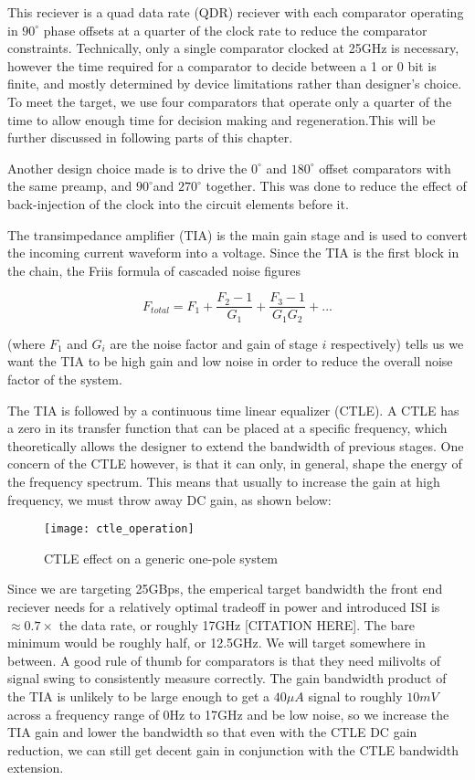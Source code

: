 This reciever is a quad data rate (QDR) reciever with each comparator operating in $90^\circ$ phase offsets at a quarter of the clock rate to reduce the comparator constraints. Technically, only a single comparator clocked at 25GHz is necessary, however the time required for a comparator to decide between a 1 or 0 bit is finite, and mostly determined by device limitations rather than designer's choice. To meet the target, we use four comparators that operate only a quarter of the time to allow enough time for decision making and regeneration.This will be further discussed in following parts of this chapter.

Another design choice made is to drive the $0^\circ$ and $180^\circ$ offset comparators with the same preamp, and $90^\circ$and $270^\circ$ together. This was done to reduce the effect of back-injection of the clock into the circuit elements before it.

The transimpedance amplifier (TIA) is the main gain stage and is used to convert the incoming current waveform into a voltage. Since the TIA is the first block in the chain, the Friis formula of cascaded noise figures

\begin{equation}
\label{friis}
F_{total}=F_1+\frac{F_2-1}{G_1}+\frac{F_3-1}{G_1G_2}+...
\end{equation}

(where $F_1$ and $G_i$ are the noise factor and gain of stage $i$ respectively) tells us we want the TIA to be high gain and low noise in order to reduce the overall noise factor of the system.

The TIA is followed by a continuous time linear equalizer (CTLE). A CTLE has a zero in its transfer function that can be placed at a specific frequency, which theoretically allows the designer to extend the bandwidth of previous stages. One concern of the CTLE however, is that it can only, in general, shape the energy of the frequency spectrum. This means that usually to increase the gain at high frequency, we must throw away DC gain, as shown below:

\begin{figure}[h]
\centering
\texttt{[image: ctle\_operation]}
\caption{CTLE effect on a generic one-pole system}
\label{fig:CTLE Operation}
\end{figure}

Since we are targeting 25GBps, the emperical target bandwidth the front end reciever needs for a relatively optimal tradeoff in power and introduced ISI is $\approx 0.7\times$ the data rate, or roughly 17GHz [CITATION HERE]. The bare minimum would be roughly half, or 12.5GHz. We will target somewhere in between. A good rule of thumb for comparators is that they need milivolts of signal swing to consistently measure correctly. The gain bandwidth product of the TIA is unlikely to be large enough to get a $40\mu A$ signal to roughly $10mV$ across a frequency range of 0Hz to 17GHz and be low noise, so we increase the TIA gain and lower the bandwidth so that even with the CTLE DC gain reduction, we can still get decent gain in conjunction with the CTLE bandwidth extension. 

